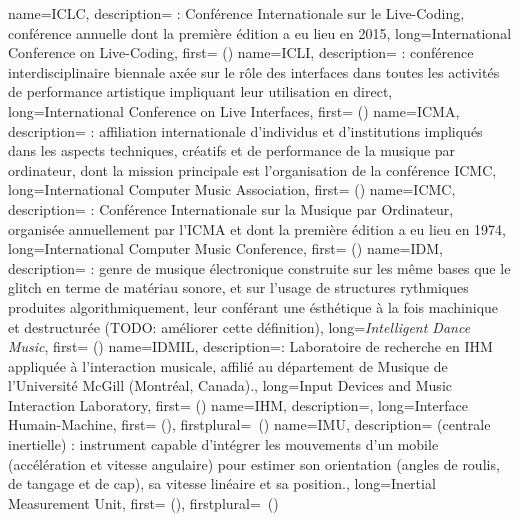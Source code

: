 {
    name={ICLC},
    description={\textit{} : Conférence Internationale sur le Live-Coding, conférence annuelle dont la première édition a eu lieu en 2015},
    long={International Conference on Live-Coding},
    first={ ()}
}
{
    name={ICLI},
    description={\textit{} : conférence interdisciplinaire biennale axée sur le rôle des interfaces dans toutes les activités de performance artistique impliquant leur utilisation en direct},
    long={International Conference on Live Interfaces},
    first={ ()}
}
{
    name={ICMA},
    description={\textit{} : affiliation internationale d'individus et d'institutions impliqués dans les aspects techniques, créatifs et de performance de la musique par ordinateur, dont la mission principale est l'organisation de la conférence \gls{ICMC}},
    long={International Computer Music Association},
    first={ ()}
}
{
    name={ICMC},
    description={\textit{} : Conférence Internationale sur la Musique par Ordinateur, organisée annuellement par l'\gls{ICMA} et dont la première édition a eu lieu en 1974},
    long={International Computer Music Conference},
    first={ ()}
}
{
    name={IDM},
    description={\textit{} : genre de musique électronique construite sur les même bases que le \gls{glitch} en terme de matériau sonore, et sur l'usage de structures rythmiques produites algorithmiquement, leur conférant une ésthétique à la fois machinique et destructurée (TODO: améliorer cette définition)},
    long={\textit{Intelligent Dance Music}},
    first={ ()}
}
{
    name={IDMIL},
    description={\textit{}: Laboratoire de recherche en \gls{IHM} appliquée à l'interaction musicale, affilié au département de Musique de l'Université McGill (Montréal, Canada).},
    long={Input Devices and Music Interaction Laboratory},
    first={ ()}
}
{
    name={IHM},
    description={\textit{}},
    long={Interface Humain-Machine},
    first={ ()},
    firstplural={\glspluralsuffix\ (\glspluralsuffix)}
}
{
    name={IMU},
    description={\textit{} (centrale inertielle) : instrument capable d'intégrer les mouvements d'un mobile (accélération et vitesse angulaire) pour estimer son orientation (angles de roulis, de tangage et de cap), sa vitesse linéaire et sa position.},
    long={Inertial Measurement Unit},
    first={ ()},
    firstplural={\glspluralsuffix\ (\glspluralsuffix)}
}
